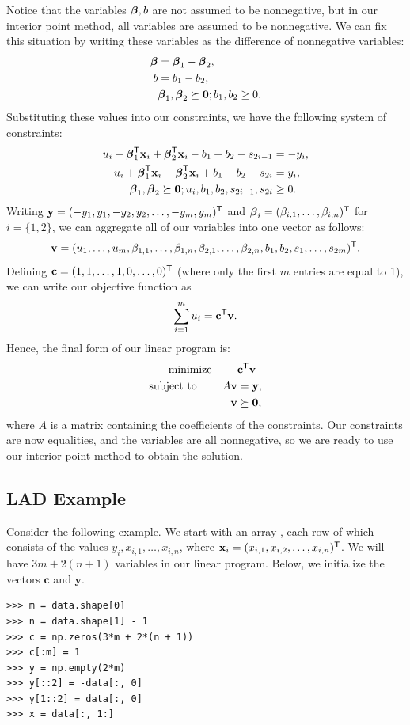 Notice that the variables $\boldsymbol{\beta}, b$ are not assumed to be nonnegative, but in our interior point method, all variables are assumed to be nonnegative.
We can fix this situation by writing these variables as the difference of nonnegative variables:
\begin{align*}
  \boldsymbol{\beta} &= \boldsymbol{\beta}_1 - \boldsymbol{\beta}_2,\\
  b &= b_1 - b_2,\\
  &\boldsymbol{\beta}_1, \boldsymbol{\beta}_2\succeq \mathbf{0}; b_1, b_2 \geq 0.
\end{align*}
Substituting these values into our constraints, we have the following system of constraints:
\begin{align*}
u_i  - \boldsymbol{\beta}_1^{\mathsf T} \mathbf{x}_i + \boldsymbol{\beta}_2^{\mathsf T} \mathbf{x}_i - b_1 + b_2 - s_{2i-1}&= -y_i,\\
u_i + \boldsymbol{\beta}_1^{\mathsf T} \mathbf{x}_i - \boldsymbol{\beta}_2^{\mathsf T} \mathbf{x}_i + b_1 - b_2 - s_{2i}&= y_i,\\
\boldsymbol{\beta}_1, \boldsymbol{\beta}_2 \succeq \mathbf{0}; u_i, b_1, b_2, s_{2i-1}, s_{2i}&\geq 0.
\end{align*}
Writing $\mathbf{y} = (-y_1, y_1, -y_2, y_2, \ldots, -y_m, y_m)^{\mathsf T} $ and $\boldsymbol{\beta}_i = (\beta_{i,1}, \ldots, \beta_{i,n})^{\mathsf T} $ for $i = \{1, 2\}$, we can aggregate all of our variables into one vector as follows:
\[
\mathbf{v} = (u_1,\ldots, u_m, \beta_{1,1},\ldots, \beta_{1,n}, \beta_{2,1},\ldots, \beta_{2,n}, b_1, b_2, s_1,\ldots,s_{2m})^{\mathsf T} .
\]
Defining $\mathbf{c} = (1, 1, \ldots, 1, 0, \ldots, 0)^{\mathsf T} $ (where only the first $m$ entries are equal to 1), we can write our objective function as
\[
\sum_{i=1}^m u_i = \mathbf{c}^{\mathsf T} \mathbf{v}.
\]
Hence, the final form of our linear program is:
\begin{align*}
  \text{minimize }\qquad &\mathbf{c}^{\mathsf T} \mathbf{v}\\
  \text{subject to }\qquad A\mathbf{v} &= \mathbf{y},\\
  \mathbf{v} &\succeq \mathbf{0},
\end{align*}
where $A$ is a matrix containing the coefficients of the constraints.
Our constraints are now equalities, and the variables are all nonnegative, so we are ready to use our interior point method to obtain the solution.

\subsection*{LAD Example}

Consider the following example.
We start with an array , each row of which consists of the values $y_i, x_{i,1},\ldots,x_{i,n}$, where $\mathbf{x}_i = (x_{i,1}, x_{i,2}, \ldots, x_{i,n})^{\mathsf T} $.
We will have $3m + 2(n+1)$ variables in our linear program.
Below, we initialize the vectors $\mathbf{c}$ and $\mathbf{y}$.
\begin{lstlisting}
>>> m = data.shape[0]
>>> n = data.shape[1] - 1
>>> c = np.zeros(3*m + 2*(n + 1))
>>> c[:m] = 1
>>> y = np.empty(2*m)
>>> y[::2] = -data[:, 0]
>>> y[1::2] = data[:, 0]
>>> x = data[:, 1:]
\end{lstlisting}

